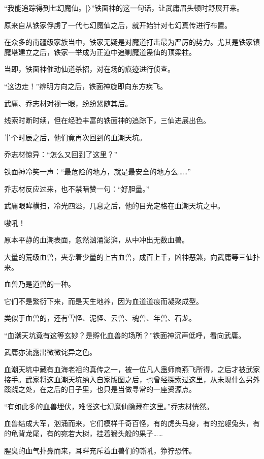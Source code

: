 
\begin{this_body}

“我能追踪得到七幻魔仙。[〉”铁面神的这一句话，让武庸眉头顿时舒展开来。

原来自从铁家俘虏了一代七幻魔仙之后，就开始针对七幻真传进行布置。

在众多的南疆级家族当中，铁家无疑是对魔道打击最为严厉的势力。尤其是铁家镇魔塔建立之后，铁家一举成为正道中追剿魔道蛊仙的顶梁柱。

当即，铁面神催动仙道杀招，对在场的痕迹进行侦查。

“这边走！”辨明方向之后，铁面神旋即向东方疾飞。

武庸、乔志材对视一眼，纷纷紧随其后。

线索时断时续，但在经验丰富的铁面神的追踪下，三仙进展出色。

半个时辰之后，他们竟再次回到的血潮天坑。

乔志材惊异：“怎么又回到了这里？”

铁面神冷笑一声：“最危险的地方，就是最安全的地方么……”

乔志材反应过来，也不禁暗赞一句：“好胆量。”

武庸眼眸横扫，冷光四溢，几息之后，他的目光定格在血潮天坑之中。

嗷吼！

原本平静的血潮表面，忽然汹涌澎湃，从中冲出无数血兽。

大量的荒级血兽，夹杂着少量的上古血兽，成百上千，凶神恶煞，向武庸等三仙扑来。

血兽乃是道兽的一种。

它们不是繁衍下来，而是天生地养，因为血道道痕而凝聚成型。

类似于血兽的，还有雪怪、泥怪、云兽、魂兽、年兽、石龙。

“血潮天坑竟有这等玄妙？是孵化血兽的场所？”铁面神沉声低呼，看向武庸。

武庸亦流露出微微诧异之色。

血潮天坑中藏有血海老祖的真传之一，被一位凡人蛊师商燕飞所得，之后才被武家接手。武家将这血潮天坑纳入自家版图之后，也曾经探索过这里，从未现什么另外蹊跷之处，在之后的日子里，也只是当做寻常的一座资源点。

“有如此多的血兽埋伏，难怪这七幻魔仙隐藏在这里。”乔志材恍然。

血兽结成大军，汹涌而来，它们模样千奇百怪，有的虎头马身，有的蛇躯兔头，有的龟背龙尾，有的宛若大树，挂着猴头般的果子……

腥臭的血气扑鼻而来，耳畔充斥着血兽们的嘶吼，狰狞恐怖。


\end{this_body}
